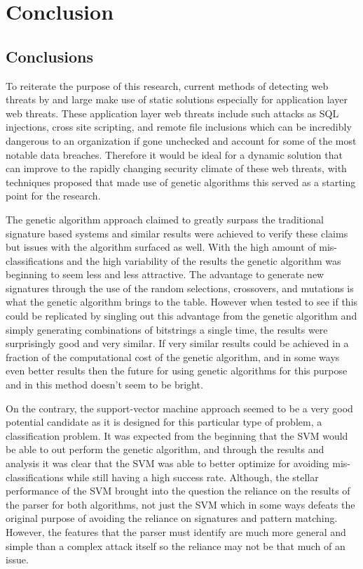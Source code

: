 \chapter{Conclusion}

\section{Conclusions}

To reiterate the purpose of this research, current methods of detecting web threats by and large make use of static solutions especially for application layer web threats.  These application layer web threats include such attacks as SQL injections, cross site scripting, and remote file inclusions which can be incredibly dangerous to an organization if gone unchecked and account for some of the most notable data breaches.  Therefore it would be ideal for a dynamic solution that can improve to the rapidly changing security climate of these web threats, with techniques proposed that made use of genetic algorithms this served as a starting point for the research.  

The genetic algorithm approach claimed to greatly surpass the traditional signature based systems and similar results were achieved to verify these claims but issues with the algorithm surfaced as well.  With the high amount of mis-classifications and the high variability of the results the genetic algorithm was beginning to seem less and less attractive.  The advantage to generate new signatures through the use of the random selections, crossovers, and mutations is what the genetic algorithm brings to the table.  However when tested to see if this could be replicated by singling out this advantage from the genetic algorithm and simply generating combinations of bitstrings a single time, the results were surprisingly good and very similar.  If very similar results could be achieved in a fraction of the computational cost of the genetic algorithm, and in some ways even better results then the future for using genetic algorithms for this purpose and in this method doesn't seem to be bright.

On the contrary, the support-vector machine approach seemed to be a very good potential candidate as it is designed for this particular type of problem, a classification problem.  It was expected from the beginning that the SVM would be able to out perform the genetic algorithm, and through the results and analysis it was clear that the SVM was able to better optimize for avoiding mis-classifications while still having a high success rate.  Although, the stellar performance of the SVM brought into the question the reliance on the results of the parser for both algorithms, not just the SVM which in some ways defeats the original purpose of avoiding the reliance on signatures and pattern matching.  However, the features that the parser must identify are much more general and simple than a complex attack itself so the reliance may not be that much of an issue.

